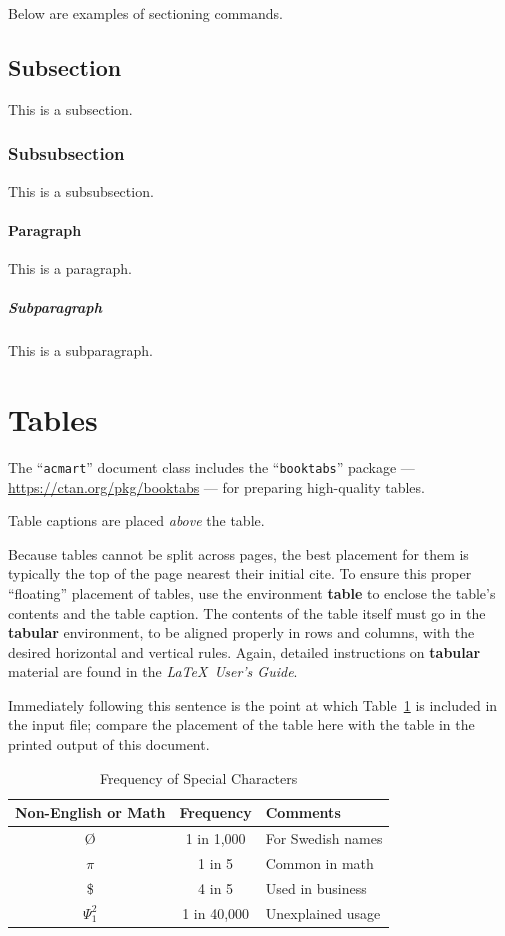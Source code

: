 \documentclass[sigconf, review]{acmart}
\begin{document}
Below are examples of sectioning commands.

\subsection{Subsection}
\label{sec:subsection}

This is a subsection.

\subsubsection{Subsubsection}
\label{sec:subsubsection}

This is a subsubsection.

\paragraph{Paragraph}

This is a paragraph.

\subparagraph{Subparagraph}

This is a subparagraph.

\section{Tables}

The ``\verb|acmart|'' document class includes the ``\verb|booktabs|''
package --- \url{https://ctan.org/pkg/booktabs} --- for preparing
high-quality tables.

Table captions are placed {\itshape above} the table.

Because tables cannot be split across pages, the best placement for
them is typically the top of the page nearest their initial cite.  To
ensure this proper ``floating'' placement of tables, use the
environment \textbf{table} to enclose the table's contents and the
table caption.  The contents of the table itself must go in the
\textbf{tabular} environment, to be aligned properly in rows and
columns, with the desired horizontal and vertical rules.  Again,
detailed instructions on \textbf{tabular} material are found in the
\textit{\LaTeX\ User's Guide}.

Immediately following this sentence is the point at which
Table~\ref{tab:freq} is included in the input file; compare the
placement of the table here with the table in the printed output of
this document.

\begin{table}
  \caption{Frequency of Special Characters}
  \label{tab:freq}
  \begin{tabular}{ccl}
    \toprule
    Non-English or Math&Frequency&Comments\\
    \midrule
    \O & 1 in 1,000& For Swedish names\\
    $\pi$ & 1 in 5& Common in math\\
    \$ & 4 in 5 & Used in business\\
    $\Psi^2_1$ & 1 in 40,000& Unexplained usage\\
  \bottomrule
\end{tabular}
\end{table}
\end{document}
